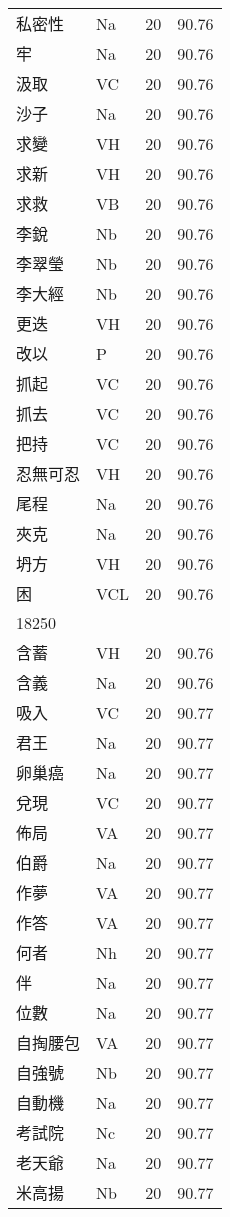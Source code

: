 \documentclass[twocolumn]{book}
\begin{document}
\begin{supertabular}{llrr}
私密性 & Na & 20 &  90.76\\
牢 & Na & 20 &  90.76\\
汲取 & VC & 20 &  90.76\\
沙子 & Na & 20 &  90.76\\
求變 & VH & 20 &  90.76\\
求新 & VH & 20 &  90.76\\
求救 & VB & 20 &  90.76\\
李銳 & Nb & 20 &  90.76\\
李翠瑩 & Nb & 20 &  90.76\\
李大經 & Nb & 20 &  90.76\\
更迭 & VH & 20 &  90.76\\
改以 & P & 20 &  90.76\\
抓起 & VC & 20 &  90.76\\
抓去 & VC & 20 &  90.76\\
把持 & VC & 20 &  90.76\\
忍無可忍 & VH & 20 &  90.76\\
尾程 & Na & 20 &  90.76\\
夾克 & Na & 20 &  90.76\\
坍方 & VH & 20 &  90.76\\
困 & VCL & 20 &  90.76\\
18250\\
含蓄 & VH & 20 &  90.76\\
含義 & Na & 20 &  90.76\\
吸入 & VC & 20 &  90.77\\
君王 & Na & 20 &  90.77\\
卵巢癌 & Na & 20 &  90.77\\
兌現 & VC & 20 &  90.77\\
佈局 & VA & 20 &  90.77\\
伯爵 & Na & 20 &  90.77\\
作夢 & VA & 20 &  90.77\\
作答 & VA & 20 &  90.77\\
何者 & Nh & 20 &  90.77\\
伴 & Na & 20 &  90.77\\
位數 & Na & 20 &  90.77\\
自掏腰包 & VA & 20 &  90.77\\
自強號 & Nb & 20 &  90.77\\
自動機 & Na & 20 &  90.77\\
考試院 & Nc & 20 &  90.77\\
老天爺 & Na & 20 &  90.77\\
米高揚 & Nb & 20 &  90.77\\

\end{supertabular}
\end{document}
